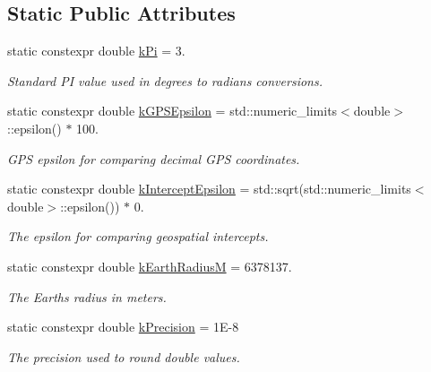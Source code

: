 \subsection*{Static Public Attributes}
\begin{DoxyCompactItemize}
\item 
static constexpr double \hyperlink{classgeo_1_1Spatial_a24d24121ccdc99cd841f3aeb744032ff}{k\+Pi} = 3.\hypertarget{classgeo_1_1Spatial_a24d24121ccdc99cd841f3aeb744032ff}{}\label{classgeo_1_1Spatial_a24d24121ccdc99cd841f3aeb744032ff}

\begin{DoxyCompactList}\small\item\em Standard PI value used in degrees to radians conversions. \end{DoxyCompactList}\item 
static constexpr double \hyperlink{classgeo_1_1Spatial_a999c14d081785779ab54afc9d3ac61bb}{k\+G\+P\+S\+Epsilon} = std\+::numeric\+\_\+limits$<$double$>$\+::epsilon() $\ast$ 100.\hypertarget{classgeo_1_1Spatial_a999c14d081785779ab54afc9d3ac61bb}{}\label{classgeo_1_1Spatial_a999c14d081785779ab54afc9d3ac61bb}

\begin{DoxyCompactList}\small\item\em G\+PS epsilon for comparing decimal G\+PS coordinates. \end{DoxyCompactList}\item 
static constexpr double \hyperlink{classgeo_1_1Spatial_a31720b63ae272b98283851a74a4d34d3}{k\+Intercept\+Epsilon} = std\+::sqrt(std\+::numeric\+\_\+limits$<$double$>$\+::epsilon()) $\ast$ 0.\hypertarget{classgeo_1_1Spatial_a31720b63ae272b98283851a74a4d34d3}{}\label{classgeo_1_1Spatial_a31720b63ae272b98283851a74a4d34d3}

\begin{DoxyCompactList}\small\item\em The epsilon for comparing geospatial intercepts. \end{DoxyCompactList}\item 
static constexpr double \hyperlink{classgeo_1_1Spatial_adb250ee63cf19c7e9d2f691184521516}{k\+Earth\+RadiusM} = 6378137.\hypertarget{classgeo_1_1Spatial_adb250ee63cf19c7e9d2f691184521516}{}\label{classgeo_1_1Spatial_adb250ee63cf19c7e9d2f691184521516}

\begin{DoxyCompactList}\small\item\em The Earth\textquotesingle{}s radius in meters. \end{DoxyCompactList}\item 
static constexpr double \hyperlink{classgeo_1_1Spatial_a317a6c113f7c71a94e706d47a19ed182}{k\+Precision} = 1\+E-\/8\hypertarget{classgeo_1_1Spatial_a317a6c113f7c71a94e706d47a19ed182}{}\label{classgeo_1_1Spatial_a317a6c113f7c71a94e706d47a19ed182}

\begin{DoxyCompactList}\small\item\em The precision used to round double values. \end{DoxyCompactList}\end{DoxyCompactItemize}


